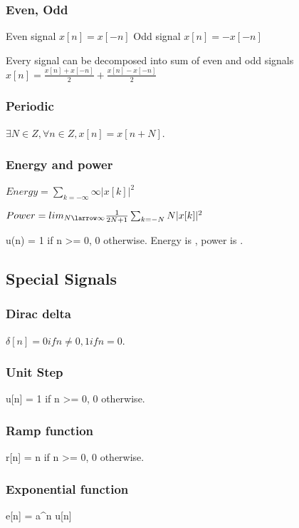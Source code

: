 \documentclass{article}
\begin{document}
\subsubsection{Even, Odd}

Even signal $x[n] = x[-n]$
Odd signal $x[n] = -x[-n]$

Every signal can be decomposed into sum of even and odd signals
$x[n] = \frac{x[n] + x[-n]}{2} + \frac{x[n] -x[-n]}{2}$

\subsubsection{Periodic}
$\exists N \in Z, \forall n \in Z, x[n] = x[n + N]$.

\subsubsection{Energy and power}

$Energy = \sum_{k=-\infty}{\infty} |x[k]|^2$


$Power = lim_{N \larrow \infty} \frac{1}{2N + 1} \sum_{k=-N}{N} |x[k]|^2$


u(n) = 1 if n >= 0, 0 otherwise.
Energy is \infty, power is .


\subsection{Special Signals}

\subsubsection{Dirac delta}
$\delta[n] = 0 if n \neq 0, 1 if n = 0$.

\subsubsection{Unit Step}
u[n] = 1 if n >= 0, 0 otherwise.


\subsubsection{Ramp function}
r[n] = n if n >= 0, 0 otherwise.

\subsubsection{Exponential function}
e[n] = a^n u[n]
\end{document}
